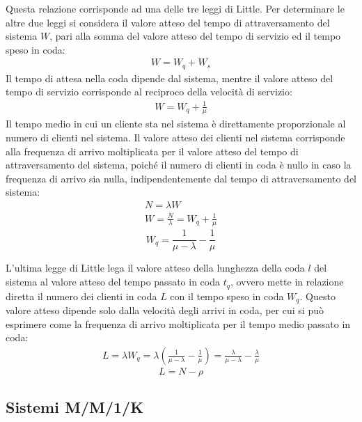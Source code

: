 \documentclass{article}
\numberwithin{equation}{subsection}
\begin{document}
Questa relazione corrisponde ad una delle tre leggi di Little. 
Per determinare le altre due leggi si considera il valore atteso del tempo di attraversamento del sistema $W$, pari alla somma del valore atteso del tempo di 
servizio ed il tempo speso in coda:
\begin{gather}
    W=W_q+W_s
\end{gather}
Il tempo di attesa nella coda dipende dal sistema, mentre il valore atteso del tempo di servizio corrisponde al reciproco della velocità di servizio:
\begin{gather*}
    W=W_q+\displaystyle\frac{1}{\mu}
\end{gather*}
Il tempo medio in cui un cliente sta nel sistema è direttamente proporzionale al numero di clienti nel sistema. Il valore atteso dei clienti nel sistema corrisponde alla 
frequenza di arrivo moltiplicata per il valore atteso del tempo di attraversamento del sistema, poiché il numero di clienti in coda è nullo in caso la frequenza di arrivo 
sia nulla, indipendentemente dal tempo di attraversamento del sistema:
\begin{gather*}
    N=\lambda W\\
    W =\displaystyle\frac{N}{\lambda}=W_q+\frac{1}{\mu}
\end{gather*}
\begin{equation}
    W_q=\displaystyle\frac{1}{\mu-\lambda}-\frac{1}{\mu}
\end{equation}

L'ultima legge di Little lega il valore atteso della lunghezza della coda $l$ del sistema al valore atteso del tempo passato in coda $t_q$, ovvero mette in relazione diretta il numero 
dei clienti in coda $L$ con il tempo speso in coda $W_q$. Questo valore atteso dipende solo dalla velocità degli arrivi in coda, per cui si può esprimere come la frequenza di 
arrivo moltiplicata per il tempo medio passato in coda:
\begin{gather*}
    L=\lambda W_q=\lambda\left(\displaystyle\frac{1}{\mu-\lambda}-\frac{1}{\mu}\right)=\frac{\lambda}{\mu-\lambda}-\frac{\lambda}{\mu}
\end{gather*}
\begin{equation}
    L=N-\rho
\end{equation}

\subsection{Sistemi M/M/1/K}
\end{document}
